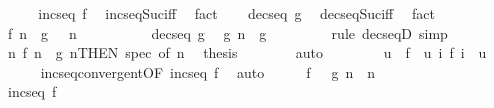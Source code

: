 \begin{isabellebody}
%
\isadelimproof
%
\endisadelimproof
%
\isatagproof
{}\isamarkupfalse%
\ {\isacharminus}{\kern0pt}\isanewline
\ \ \isamarkupfalse%
\ {\isachardoublequoteopen}incseq\ f{\isachardoublequoteclose}\ \isamarkupfalse%
\ incseq{\isacharunderscore}{\kern0pt}Suc{\isacharunderscore}{\kern0pt}iff\ \isamarkupfalse%
\ fact\isanewline
\ \ \isamarkupfalse%
\ {\isachardoublequoteopen}decseq\ g{\isachardoublequoteclose}\ \isamarkupfalse%
\ decseq{\isacharunderscore}{\kern0pt}Suc{\isacharunderscore}{\kern0pt}iff\ \isamarkupfalse%
\ fact\isanewline
\ \ \isamarkupfalse%
\ {\isachardoublequoteopen}f\ n\ {\isasymle}\ g\ {}{\isachardoublequoteclose}\ \ n\isanewline
\ \ \isamarkupfalse%
\ {\isacharminus}{\kern0pt}\isanewline
\ \ \ \ \isamarkupfalse%
\ {\isacartoucheopen}decseq\ g{\isacartoucheclose}\ \isamarkupfalse%
\ {\isachardoublequoteopen}g\ n\ {\isasymle}\ g\ {}{\isachardoublequoteclose}\isanewline
\ \ \ \ \ \ \isamarkupfalse%
\ {\isacharparenleft}{\kern0pt}rule\ decseqD{\isacharparenright}{\kern0pt}\ simp\isanewline
\ \ \ \ \isamarkupfalse%
\ {\isacartoucheopen}{\isasymforall}n{\isachardot}{\kern0pt}\ f\ n\ {\isasymle}\ g\ n{\isacartoucheclose}{\isacharbrackleft}{\kern0pt}THEN\ spec{\isacharcomma}{\kern0pt}\ of\ n{\isacharbrackright}{\kern0pt}\ \isamarkupfalse%
\ {\isacharquery}{\kern0pt}thesis\isanewline
\ \ \ \ \ \ \isamarkupfalse%
\ auto\isanewline
\ \ \isamarkupfalse%
\isanewline
\ \ \isamarkupfalse%
\ \isamarkupfalse%
\ u\ \ {\isachardoublequoteopen}f\ {\isasymlonglonglongrightarrow}\ u{\isachardoublequoteclose}\ {\isachardoublequoteopen}{\isasymforall}i{\isachardot}{\kern0pt}\ f\ i\ {\isasymle}\ u{\isachardoublequoteclose}\isanewline
\ \ \ \ \isamarkupfalse%
\ incseq{\isacharunderscore}{\kern0pt}convergent{\isacharbrackleft}{\kern0pt}OF\ {\isacartoucheopen}incseq\ f{\isacartoucheclose}{\isacharbrackright}{\kern0pt}\ \isamarkupfalse%
\ auto\isanewline
\ \ \isamarkupfalse%
\ \isamarkupfalse%
\ {\isachardoublequoteopen}f\ {}\ {\isasymle}\ g\ n{\isachardoublequoteclose}\ \ n\isanewline
\ \ \isamarkupfalse%
\ {\isacharminus}{\kern0pt}\isanewline
\ \ \ \ \isamarkupfalse%
\ {\isacartoucheopen}incseq\ f{\isacartoucheclose}\ \isamarkupfalse%

\end{isabellebody}
